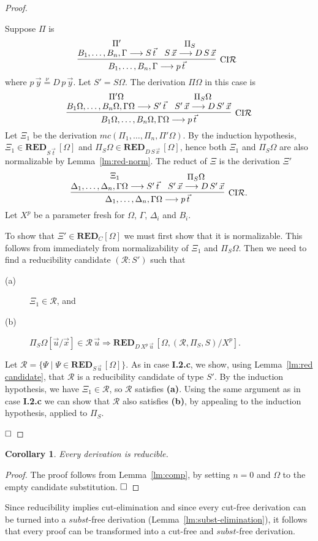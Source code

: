 \documentclass[preprint]{elsarticle}
\def\Rscr{{\mathcal R}}
\newcommand{\Seq}[2]{#1\longrightarrow #2}
\newcommand{\defnu}{\stackrel{\nu}{=}}
\newcommand{\coindR}{{\rm CI}{\cal R}}
\def\RED{{\mathbf{RED}}}
\newtheorem{corollary}[thm]{Corollary}
\def\qed{$\hfill\Box$}
\begin{document}
\begin{proof}
\begin{trivlist}
\item[\fbox{$-/\coindR$}] Suppose $\Pi$ is
$$
\infer[\coindR] {\Seq{B_1,\dots,B_n,\Gamma}{p\,\vec{t}}} {
  \deduce{\Seq{B_1,\dots,B_n,\Gamma}{S\,\vec{t}}}{\Pi'} &
  \deduce{\Seq{S\,\vec{x}}{D\,S\,\vec{x}}}{\Pi_S} } \enspace 
$$
where $p\,\vec{y} \defnu D\,p\,\vec{y}$.  Let $S' = S\Omega$.  The
derivation $\Pi\Omega$ in this case is 
$$
\infer[\coindR]
{\Seq{B_1\Omega,\dots,B_n\Omega,\Gamma\Omega}{p\,\vec{t}}} {
  \deduce{\Seq{B_1\Omega,\dots,B_n\Omega,\Gamma\Omega}{S'\,\vec{t}}}{\Pi'\Omega}
  & \deduce{\Seq{S'\,\vec{x}}{D\,S'\,\vec{x}}}{\Pi_S\Omega} }
$$
Let $\Xi_1$ be the derivation $mc(\Pi_1,\ldots,\Pi_n,\Pi'\Omega)$.  By
the induction hypothesis, $\Xi_1 \in \RED_{S\,\vec t}\, [\Omega]$ and
$\Pi_S\Omega \in \RED_{D\,S\,\vec x}\, [\Omega]$, hence both $\Xi_1$ and
$\Pi_S\Omega$ are also normalizable by Lemma~\ref{lm:red-norm}.  The
 reduct of $\Xi$ is the derivation $\Xi'$
$$
\infer[\coindR .]
{\Seq{\Delta_1,\dots,\Delta_n,\Gamma\Omega}{p\,\vec{t}}} {
  \deduce{\Seq{\Delta_1,\dots,\Delta_n,\Gamma\Omega}{S'\,\vec{t}}}{\Xi_1}
  & \deduce{\Seq{S'\,\vec{x}}{D\,S'\,\vec{x}}}{\Pi_S\Omega} }
$$
Let $X^p$ be a parameter fresh for  $\Omega$,
$\Gamma$, $\Delta_i$ and $B_i$.

To show that $\Xi' \in \RED_C[\Omega]$ we must first show that it is
normalizable.  This follows from immediately from normalizability of
$\Xi_1$ and $\Pi_S\Omega$.  Then we need to find a reducibility
candidate $(\Rscr : S')$ such that
\begin{description}
\item[(a)] $\Xi_1 \in \Rscr$, and
\item[(b)] $\Pi_S\Omega[\vec u/\vec x] \in \Rscr\,\vec u \Rightarrow
  \RED_{D\,X^p\,\vec u}\, [\Omega,(\Rscr,\Pi_S,S)/X^p]$.
\end{description}
Let
$
\Rscr = \{\Psi \mid \Psi \in \RED_{S\,\vec u}\, [\Omega] \}.
$
As in case {\bf I.2.c}, we show, using Lemma~\ref{lm:red candidate},
that $\Rscr$ is a reducibility candidate of type $S'$.  By the
induction hypothesis, we have $\Xi_1 \in \Rscr$, so $\Rscr$ satisfies
{\bf (a)}.  Using the same argument as in case {\bf I.2.c} we can show
that $\Rscr$ also satisfies {\bf (b)}, \ie by appealing to the
induction hypothesis, applied to $\Pi_S$.
\end{trivlist}
\qed
\end{proof}


\begin{corollary}
  Every derivation is reducible.
\end{corollary}
\begin{proof}
  The proof follows from Lemma~\ref{lm:comp}, by setting $n=0$ and 
  $\Omega$ to the empty candidate substitution. \qed
\end{proof}
Since reducibility implies cut-elimination and since every cut-free
derivation can be turned into a $subst$-free derivation
(Lemma~\ref{lm:subst-elimination}), it follows that every proof can be
transformed into a cut-free and $subst$-free derivation.
\end{document}
